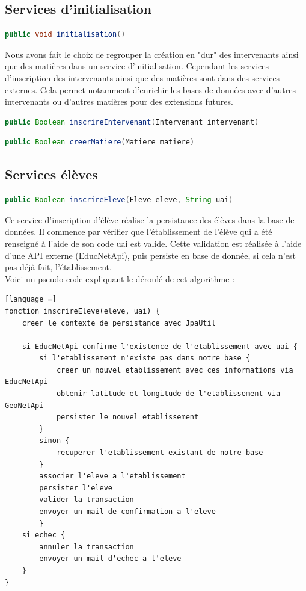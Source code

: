 \subsection{Services d'initialisation}

\begin{lstlisting}[language = Java]
public void initialisation()
\end{lstlisting}

Nous avons fait le choix de regrouper la création en "dur" des intervenants ainsi que des matières dans un service d'initialisation. Cependant les services d'inscription des intervenants ainsi que des matières sont dans des services externes. Cela permet notamment d'enrichir les bases de données avec d'autres intervenants ou d'autres matières pour des extensions futures.

\begin{lstlisting}[language = Java]
public Boolean inscrireIntervenant(Intervenant intervenant)
\end{lstlisting}
\begin{lstlisting}[language = Java]
public Boolean creerMatiere(Matiere matiere)
\end{lstlisting}

\subsection{Services élèves}
\begin{lstlisting}[language = Java]
public Boolean inscrireEleve(Eleve eleve, String uai)
\end{lstlisting}
Ce service d'inscription d'élève réalise la persistance des élèves dans la base de données. Il commence par vérifier que l'établissement de l'élève qui a été renseigné à l'aide de son code uai est valide. Cette validation est réalisée à l'aide d'une API externe (EducNetApi), puis persiste en base de donnée, si cela n'est pas déjà fait, l'établissement.\\
Voici un pseudo code expliquant le déroulé de cet algorithme : 
\begin{lstlisting}[language =]
fonction inscrireEleve(eleve, uai) {
    creer le contexte de persistance avec JpaUtil
    
    si EducNetApi confirme l'existence de l'etablissement avec uai {
        si l'etablissement n'existe pas dans notre base {
            creer un nouvel etablissement avec ces informations via EducNetApi
            obtenir latitude et longitude de l'etablissement via GeoNetApi
            persister le nouvel etablissement
        }
        sinon {
            recuperer l'etablissement existant de notre base
        }
        associer l'eleve a l'etablissement
        persister l'eleve
        valider la transaction
        envoyer un mail de confirmation a l'eleve
        }
    si echec {
        annuler la transaction
        envoyer un mail d'echec a l'eleve
    }
}
\end{lstlisting}

